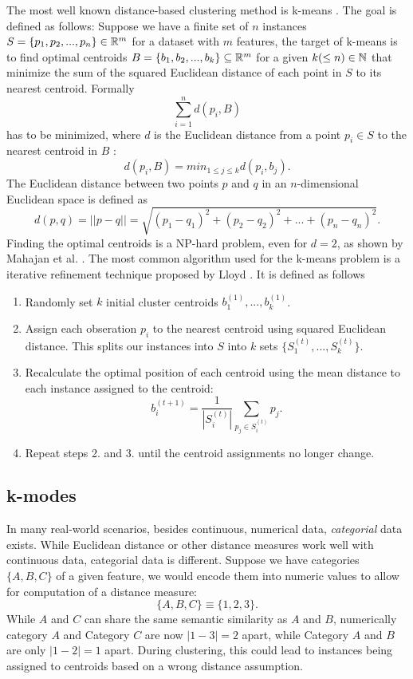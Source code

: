 The most well known distance-based clustering method is k-means \cite{kmeans}. The goal is defined as follows: Suppose we have a finite set of $n$ instances $S=\{p_1, p_2, ..., p_n\} \in \mathbb{R}^m$ for a dataset with $m$ features, the target of k-means is to find optimal centroids $B=\{b_1, b_2, ..., b_k\} \subseteq \mathbb{R}^m$ for a given $k (\leq n) \in \mathbb{N}$ that minimize the sum of the squared Euclidean distance of each point in $S$ to its nearest centroid. Formally
$$\sum_{i=1}^n  d(p_i, B)$$
has to be minimized, where $d$ is the Euclidean distance from a point $p_i \in S$ to the nearest centroid in $B$ \cite{kmeans_np_hard}:
$$d(p_i, B) = min_{1 \leq j \leq k} d(p_i, b_j).$$
The Euclidean distance between two points $p$ and $q$ in an $n$-dimensional Euclidean space is defined as 
$$d(p, q) = || p - q || = \sqrt{(p_1 - q_1)^2 + (p_2 - q_2)^2 + ... + (p_n - q_n)^2}.$$
Finding the optimal centroids is a NP-hard problem, even for $d=2$, as shown by Mahajan et al. \cite{kmeans_np_hard}. The most common algorithm used for the k-means problem is a iterative refinement technique proposed by Lloyd \cite{kmeans_lloyd}. It is defined as follows
\begin{enumerate} 
	\item Randomly set $k$ initial cluster centroids $b_1^{(1)}, ..., b_k^{(1)}$.
	\item Assign each obseration $p_i$ to the nearest centroid using squared Euclidean distance. This splits our instances into $S$ into $k$ sets $\{S_1^{(t)}, ..., S_k^{(t)}\}$.
	\item Recalculate the optimal position of each centroid using the mean distance to each instance assigned to the centroid: 
$$b_i^{(t+1)} = \frac{1}{|S_i^{(t)}|} \sum_{p_j \in S_i^{(t)}} p_j.$$
	\item Repeat steps 2. and 3. until the centroid assignments no longer change.
\end{enumerate}

\subsection{k-modes} \label{k-modes}

In many real-world scenarios, besides continuous, numerical data, \textit{categorial} data exists. While Euclidean distance or other distance measures work well with continuous data, categorial data is different. Suppose we have categories $\{A, B, C\}$ of a given feature, we would encode them into numeric values to allow for computation of a distance measure:
$$\{A, B, C\} \equiv \{1, 2, 3\}.$$
While $A$ and $C$ can share the same semantic similarity as $A$ and $B$, numerically category $A$ and Category $C$ are now $|1-3| = 2$ apart, while Category $A$ and $B$ are only $|1-2|=1$ apart. During clustering, this could lead to instances being assigned to centroids based on a wrong distance assumption.

